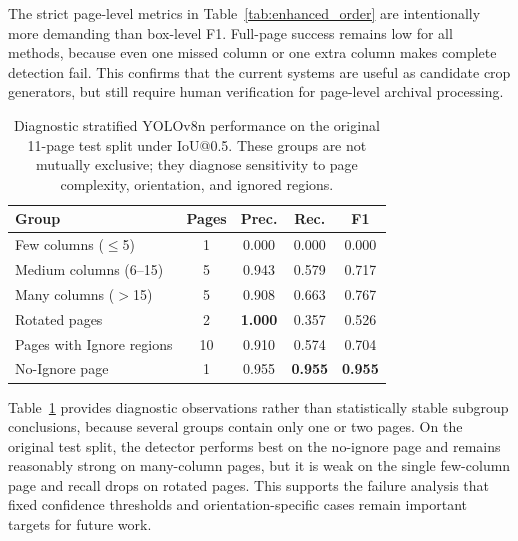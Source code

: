 \documentclass[pdflatex,sn-mathphys-num]{sn-jnl}
\begin{document}
The strict page-level metrics in Table~\ref{tab:enhanced_order} are intentionally more demanding than box-level F1. Full-page success remains low for all methods, because even one missed column or one extra column makes complete detection fail. This confirms that the current systems are useful as candidate crop generators, but still require human verification for page-level archival processing.

\begin{table}[t]
\centering
\scriptsize\setlength{\tabcolsep}{3pt}
\caption{Diagnostic stratified YOLOv8n performance on the original 11-page test split under IoU@0.5. These groups are not mutually exclusive; they diagnose sensitivity to page complexity, orientation, and ignored regions.}
\label{tab:stratified_yolo}
\begin{tabular}{lcccc}
\toprule
Group & Pages & Prec. & Rec. & F1 \\
\midrule
Few columns ($\leq$5) & 1 & 0.000 & 0.000 & 0.000 \\
Medium columns (6--15) & 5 & 0.943 & 0.579 & 0.717 \\
Many columns ($>$15) & 5 & 0.908 & 0.663 & 0.767 \\
Rotated pages & 2 & \textbf{1.000} & 0.357 & 0.526 \\
Pages with Ignore regions & 10 & 0.910 & 0.574 & 0.704 \\
No-Ignore page & 1 & 0.955 & \textbf{0.955} & \textbf{0.955} \\
\bottomrule
\end{tabular}
\end{table}

Table~\ref{tab:stratified_yolo} provides diagnostic observations rather than statistically stable subgroup conclusions, because several groups contain only one or two pages. On the original test split, the detector performs best on the no-ignore page and remains reasonably strong on many-column pages, but it is weak on the single few-column page and recall drops on rotated pages. This supports the failure analysis that fixed confidence thresholds and orientation-specific cases remain important targets for future work.
\end{document}
